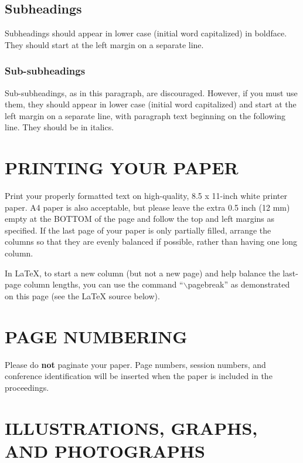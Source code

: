 \documentclass{article}
\begin{document}
\subsection{Subheadings}
\label{ssec:subhead}

Subheadings should appear in lower case (initial word capitalized) in
boldface.  They should start at the left margin on a separate line.

\subsubsection{Sub-subheadings}
\label{sssec:subsubhead}

Sub-subheadings, as in this paragraph, are discouraged. However, if you
must use them, they should appear in lower case (initial word
capitalized) and start at the left margin on a separate line, with paragraph
text beginning on the following line.  They should be in italics.

\section{PRINTING YOUR PAPER}
\label{sec:print}

Print your properly formatted text on high-quality, 8.5 x 11-inch white printer
paper. A4 paper is also acceptable, but please leave the extra 0.5 inch (12 mm)
empty at the BOTTOM of the page and follow the top and left margins as
specified.  If the last page of your paper is only partially filled, arrange
the columns so that they are evenly balanced if possible, rather than having
one long column.

In LaTeX, to start a new column (but not a new page) and help balance the
last-page column lengths, you can use the command ``$\backslash$pagebreak'' as
demonstrated on this page (see the LaTeX source below).

\section{PAGE NUMBERING}
\label{sec:page}

Please do {\bf not} paginate your paper.  Page numbers, session numbers, and
conference identification will be inserted when the paper is included in the
proceedings.

\section{ILLUSTRATIONS, GRAPHS, AND PHOTOGRAPHS}
\label{sec:illust}
\end{document}
